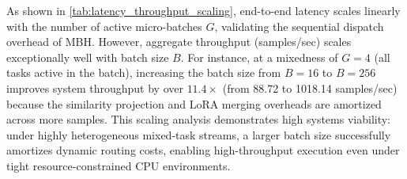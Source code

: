 \begin{table}[h]
\caption{Inference wall-clock latency (ms) and throughput (samples/sec) of our PFSR + MBH framework under varying batch sizes $B$ and task mixedness configurations $G$ (number of active micro-batches).}
\label{tab:latency_throughput_scaling}
\vskip 0.1in
\begin{center}
\begin{small}
\end{small}
\end{center}
\vskip -0.1in
\end{table}

As shown in \cref{tab:latency_throughput_scaling}, end-to-end latency scales linearly with the number of active micro-batches $G$, validating the sequential dispatch overhead of MBH. However, aggregate throughput (samples/sec) scales exceptionally well with batch size $B$. For instance, at a mixedness of $G=4$ (all tasks active in the batch), increasing the batch size from $B=16$ to $B=256$ improves system throughput by over \textbf{$11.4\times$} (from 88.72 to 1018.14 samples/sec) because the similarity projection and LoRA merging overheads are amortized across more samples. This scaling analysis demonstrates high systems viability: under highly heterogeneous mixed-task streams, a larger batch size successfully amortizes dynamic routing costs, enabling high-throughput execution even under tight resource-constrained CPU environments.

